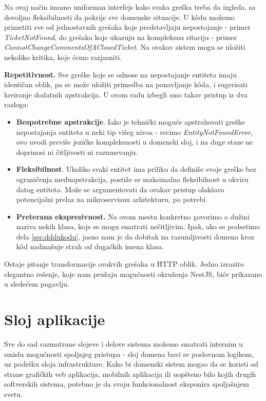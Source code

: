 \documentclass[12pt,oneside]{memoir}
\begin{document}
Na ovaj način imamo uniforman interfejs kako svaka greška treba da izgleda, sa dovoljno fleksibilnosti da pokrije sve domenske situacije. U k\^{o}du možemo primetiti sve od jednostavnih grešaka koje predstavljaju nepostojanje - primer \textit{TicketNotFound}, do grešaka koje ukazuju na kompleksnu sitaciju - primer \textit{CannotChangeCommentsOfAClosedTicket}. Na ovakav sistem mogu se uložiti nekoliko kritika, koje ćemo razjasniti.

\textbf{Repetitivnost.}  
Sve greške koje se odnose na nepostajanje entiteta imaju identičan oblik, pa se može uložiti primedba na ponavljanje k\^{o}da, i sugerisati kreiranje dodatnih apstrakcija. U ovom radu izbegli smo takav pristup iz dva razloga:
\begin{itemize}
    \item \textbf{Bespotrebne apstrakcije}. Iako je tehnički moguće apstrahovati greške nepostajanja entiteta u neki tip višeg nivoa - recimo \textit{EntityNotFoundError}, ovo uvodi previše jezičke kompleksnosti u domenski sloj, i na duge staze ne doprinosi ni čitljivosti ni razumevanju.
    \item \textbf{Fleksibilnost}. Ukoliko svaki entitet ima priliku da definiše svoje greške bez ograničenja međuapstrakcija, postiže se maksimalna fleksibilnost u okviru datog entiteta. Može se argumentovati da ovakav pristup olakšava potencijalni prelaz na mikroservisnu arhitekturu, po potrebi.
    \item \textbf{Preterana ekspresivnost.} Na ovom mestu konkretno govorimo o dužini naziva nekih klasa, koje se mogu smatrati nečitljivim. Ipak, ako se podsetimo dela \ref{sec:dddukodu}, jasno nam je da dobitak na razumljivosti domena kroz k\^{o}d nadmašuje strah od dugačkih imena klasa.
\end{itemize}


Ostaje pitanje transformacije ovakvih grešaka u HTTP oblik. Jedno izrazito elegantno rešenje, koje nam pružaju mogućnosti okruženja NestJS, biće prikazano u sledećem pogavlju.

\section{Sloj aplikacije}

Sve do sad razmatrane slojeve i delove sistema možemo smatrati internim u smislu mogućnosti spoljnjeg pristupa - sloj domena bavi se poslovnom logikom, uz podršku sloja infrastrukture. Kako bi domenski sistem mogao da se koristi od strane grafičkih veb aplikacija, mobilnih aplikacija ili uopšteno bilo kojih drugih softverskih sistema, potebno je da svoju funkcionalnost eksponira spoljašnjem svetu. 
\end{document}
